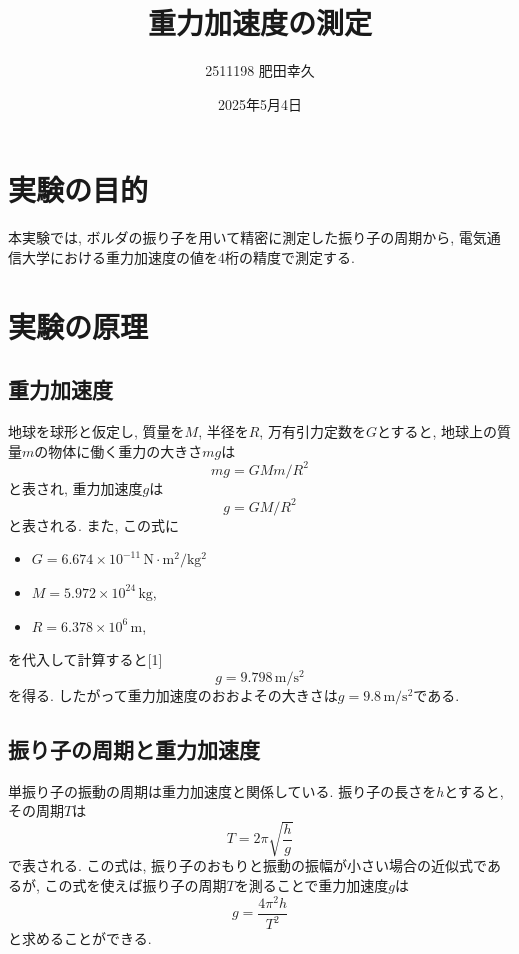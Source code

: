 \documentclass{jarticle}
\title{重力加速度の測定}
\author{2511198 肥田幸久}
\date{2025年5月4日}
\begin{document}
\maketitle

\section{実験の目的}

本実験では, ボルダの振り子を用いて精密に測定した振り子の周期から, 電気通信大学における重力加速度の値を4桁の精度で測定する.


\section{実験の原理}


\subsection{重力加速度}

地球を球形と仮定し, 質量を$M$, 半径を$R$, 万有引力定数を$G$とすると, 地球上の質量$m$の物体に働く重力の大きさ$mg$は
\begin{equation}
  mg=GMm/R^2
\end{equation}
と表され, 重力加速度$g$は
\begin{equation}
  g=GM/R^2
\end{equation}
と表される. また, この式に
\begin{itemize}
  \item $G=6.674\times10^{-11}\,\mathrm{N\cdot m^2/kg^2}$
  \item $M=5.972\times10^{24}\,\mathrm{kg}$,
  \item $R=6.378\times10^6\,\mathrm{m}$,
\end{itemize}
を代入して計算すると[1]
\begin{equation}
  g=9.798\,\mathrm{m/s^2}
\end{equation}
を得る.
したがって重力加速度のおおよその大きさは$g=9.8\,\mathrm{m/s^2}$である.


\subsection{振り子の周期と重力加速度}

単振り子の振動の周期は重力加速度と関係している. 振り子の長さを$h$とすると, その周期$T$は
\begin{equation}
  \label{equ:T-from-G}
  T=2\pi\sqrt{\frac{h}{g}}
\end{equation}
で表される.
この式は, 振り子のおもりと振動の振幅が小さい場合の近似式であるが, この式を使えば振り子の周期$T$を測ることで重力加速度$g$は
\begin{equation}
  \label{equ:G-from-T-1}
  g=\frac{4\pi^2h}{T^2}
\end{equation}
と求めることができる.
\end{document}
